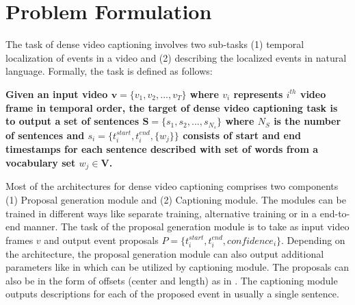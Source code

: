 \section{Problem Formulation}
\par The task of dense video captioning involves two sub-tasks (1) temporal localization of events in a video and (2) describing the localized events in natural language. 
Formally, the task is defined as follows:

\par \textbf{Given an input video $\mathbf{v} = \{v_1, v_2, ... , v_T \}$ where $v_i$ represents $i^{th}$ video frame in temporal order, the target of dense video captioning task is to output a set of sentences $\mathbf{S} = \{s_1, s_2, ... , s_{N_s}\}$ where $N_S$ is the number of sentences and $s_i = \{t_i^{start}, t_i^{end}, \{w_j\} \}$ consists of start and end timestamps for each sentence described with set of words from a vocabulary set $w_j \in \mathbf{V}$.}

\par Most of the architectures for dense video captioning comprises two components (1) Proposal generation module and (2) Captioning module. The modules can be trained in different ways like separate training, alternative training or in a end-to-end manner. The task of the proposal generation module is to take as input video frames $v$ and output event proposals $P = \{t_i^{start}, t_i^{end}, confidence_i \}$. Depending on the architecture, the proposal generation module can also output additional parameters like in \cite{krishna2017densecaptioning, li2018jointly, wang2018bidirectional} which can be utilized by captioning module. The proposals can also be in the form of offsets (center and length) as in \cite{li2018jointly, iashin2020better, xu2018joint, deng2021sketch, zhou2018end}. The captioning module outputs descriptions for each of the proposed event in usually a single sentence.